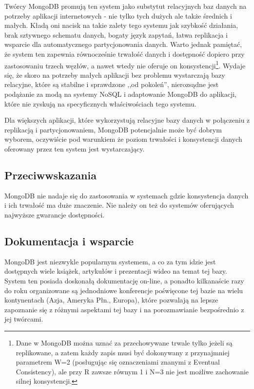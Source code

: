 Twórcy MongoDB promują ten system jako substytut relacyjnych baz danych na potrzeby aplikacji internetowych - nie tylko tych dużych ale także średnich i małych.
Kładą oni nacisk na takie zalety tego systemu jak szybkość działania, brak sztywnego schematu danych, bogaty język zapytań, łatwa replikacja i wsparcie dla automatycznego partycjonowania danych.
Warto jednak pamiętać, że system ten zapewnia równocześnie trwałość danych i dostępność dopiero przy zastosowaniu trzech węzłów, a nawet wtedy nie oferuje on konsystencji\footnote{Dane w MongoDB można uznać za przechowywane trwale tylko jeżeli są replikowane, a zatem każdy zapis musi być dokonywany z przynajmniej parametrem W=2 (posługując się oznaczeniami znanymi z Eventual Consistency), ale przy R zawsze równym 1 i N=3 nie jest możliwe zachowanie silnej konsystencji.}.
Wydaje się, że skoro na potrzeby małych aplikacji bez problemu wystarczają bazy relacyjne, które są stabilne i sprawdzone ,,od pokoleń'', nierozsądne jest podążanie za modą na systemy NoSQL i adaptowanie MongoDB do aplikacji, które nie zyskują na specyficznych właściwościach tego systemu.

Dla większych aplikacji, które wykorzystują relacyjne bazy danych w połączeniu z replikacją i partycjonowaniem, MongoDB potencjalnie może być dobrym wyborem, oczywiście pod warunkiem że poziom trwałości i konsystencji danych oferowany przez ten system jest wystarczający.

\subsection*{Przeciwwskazania}

MongoDB nie nadaje się do zastosowania w systemach gdzie konsystencja danych i ich trwałość ma duże znaczenie.
Nie należy on też do systemów oferujących najwyższe gwarancje dostępności.

\subsection*{Dokumentacja i wsparcie}

MongoDB jest niezwykle popularnym systemem, a co za tym idzie jest dostępnych wiele książek, artykułów i prezentacji wideo na temat tej bazy.
System ten posiada doskonałą dokumentację on-line, a ponadto kilkanaście razy do roku organizowane są jednodniowe konferencje poświęcone tej bazie na wielu kontynentach (Azja, Ameryka Płn., Europa), które pozwalają na lepsze zapoznanie się z różnymi aspektami tej bazy i na porozmawianie bezpośrednio z jej twórcami.

